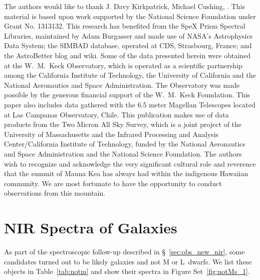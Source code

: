 \documentclass[modern]{aastex61}
\begin{document}
\acknowledgments

The authors would like to thank J. Davy Kirkpatrick, Michael Cushing, .
This material is based upon work supported by the National Science Foundation under Grant No. 1313132.
This research has benefited from the SpeX Prism Spectral Libraries, maintained by Adam Burgasser
and made use of NASA's Astrophysics Data System; the SIMBAD database, operated at CDS, Strasbourg, France; and the AstroBetter blog and wiki.
Some of the data presented herein were obtained at the W.~M.~Keck Observatory, which is operated as a scientific partnership among the California Institute of Technology, the University of California and the National Aeronautics and Space Administration. The Observatory was made possible by the generous financial support of the W.~M.~Keck Foundation.
This paper also includes data gathered with the 6.5 meter Magellan Telescopes located at Las Campanas Observatory, Chile.
This publication makes use of data products from the Two Micron All Sky Survey, which is a joint project of the University of Massachusetts and the Infrared Processing and Analysis Center/California Institute of Technology, funded by the National Aeronautics and Space Administration and the National Science Foundation.
The authors wish to recognize and acknowledge the very significant cultural role and reverence that the summit of Mauna Kea has always had within the indigenous Hawaiian community. We are most fortunate to have the opportunity to conduct observations from this mountain.



\clearpage
\appendix
\section{NIR Spectra of Galaxies}
\label{sec:galaxies}
As part of the spectroscopic follow-up described in \S~\ref{sec:obs_new_nir}, some candidates turned out to be likely galaxies and not M or L~dwarfs. We list these objects in Table~\ref{tab:notm} and show their spectra in Figure Set~\ref{fig:notMs_1}.
\end{document}
